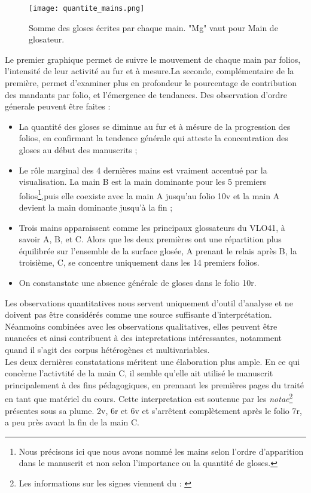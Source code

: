 \documentclass[a4paper, twoside, 12pt]{book}
\begin{document}
\begin{figure}[H]
    \centering
    \texttt{[image: quantite\_mains.png]}
    \caption{Somme des gloses écrites par chaque main. "Mg" vaut pour Main de glosateur.}
\end{figure}


Le premier graphique permet de suivre le mouvement de chaque main par folios, l'intensité de leur activité au fur et à mesure.La seconde, complémentaire de la première, permet d'examiner plus en profondeur le pourcentage de contribution des mandants par folio, et l'émergence de tendances. Des observation d'ordre génerale peuvent être faites :

\begin{itemize}
    \item La quantité des gloses se diminue au fur et à mésure de la progression des folios, en confirmant la tendence générale qui atteste la concentration des gloses au début des manuscrits ;
    \item Le rôle marginal des 4 dernières mains est vraiment accentué par la visualisation. La main B est la main dominante pour les 5 premiers folios\footnote{Nous précisons ici que nous avons nommé les mains selon l'ordre d'apparition dans le manuscrit et non selon l'importance ou la quantité de gloses.},puis elle coexiste avec la main A jusqu'au folio 10v et la main A devient la main dominante jusqu'à la fin ;
    \item Trois mains apparaissent comme les principaux glossateurs du VLO41, à savoir A, B, et C. Alors que les deux premières ont une répartition plus équilibrée sur l'ensemble de la surface glosée, A prenant le relais après B, la troisième, C, se concentre uniquement dans les 14 premiers folios.
    \item On constanstate une absence générale de gloses dans le folio 10r.
\end{itemize}

Les observations quantitatives nous servent uniquement d'outil d'analyse et ne doivent pas être considérés comme une source suffisante d'interprétation. Néanmoins combinées avec les observations qualitatives, elles peuvent être nuancées et ainsi contribuent à des intepretations intéressantes, notamment quand il s'agit des corpus hétérogènes et multivariables. \\

Les deux dernières constatations méritent une élaboration plus ample. En ce qui concèrne l'activtité de la main C, il semble qu'elle ait utilisé le manuscrit principalement à des fins pédagogiques, en prennant les premières pages du traité en tant que matériel du cours. Cette interpretation est soutenue par les \textit{notae}\footnote{Les informations sur les signes viennent du : \cite{steinova2016notam}} présentes sous sa plume. 2v, 6r et 6v et s'arrêtent complètement après le folio 7r, a peu près avant la fin de la main C.
\end{document}
